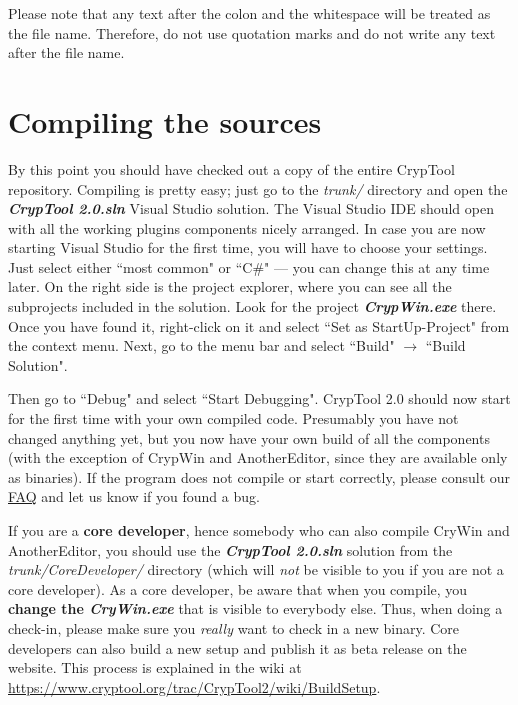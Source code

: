 \begin{center}
\end{center}

Please note that any text after the colon and the whitespace will be treated as the file name. Therefore, do not use quotation marks and do not write any text after the file name.

\section{Compiling the sources}
\label{CompilingTheSources}

By this point you should have checked out a copy of the entire CrypTool repository. Compiling is pretty easy; just go to the \textit{trunk/} directory and open the \textbf{\textit{CrypTool 2.0.sln}} Visual Studio solution. The Visual Studio IDE should open with all the working plugins components nicely arranged. In case you are now starting Visual Studio for the first time, you will have to choose your settings. Just select either ``most common" or ``C\#" --- you can change this at any time later. On the right side is the project explorer, where you can see all the subprojects included in the solution. Look for the project \textbf{\textit{CrypWin.exe}} there. Once you have found it, right-click on it and select ``Set as StartUp-Project" from the context menu. Next, go to the menu bar and select ``Build" $\rightarrow$ ``Build Solution".

Then go to ``Debug" and select ``Start Debugging". CrypTool 2.0 should now start for the first time with your own compiled code. Presumably you have not changed anything yet, but you now have your own build of all the components (with the exception of CrypWin and AnotherEditor, since they are available only as binaries). If the program does not compile or start correctly, please consult our \href{https://www.cryptool.org/trac/CrypTool2/wiki/FAQ}{FAQ} and let us know if you found a bug.

If you are a \textbf{core developer}, hence somebody who can also compile CryWin and AnotherEditor, you should use the \textbf{\textit{CrypTool 2.0.sln}} solution from the \textit{trunk/CoreDeveloper/} directory (which will \textit{not} be visible to you if you are not a core developer). As a core developer, be aware that when you compile, you \textbf{change the \textit{CryWin.exe}} that is visible to everybody else. Thus, when doing a check-in, please make sure you \textit{really} want to check in a new binary. Core developers can also build a new setup and publish it as beta release on the website. This process is explained in the wiki at \url{https://www.cryptool.org/trac/CrypTool2/wiki/BuildSetup}.
